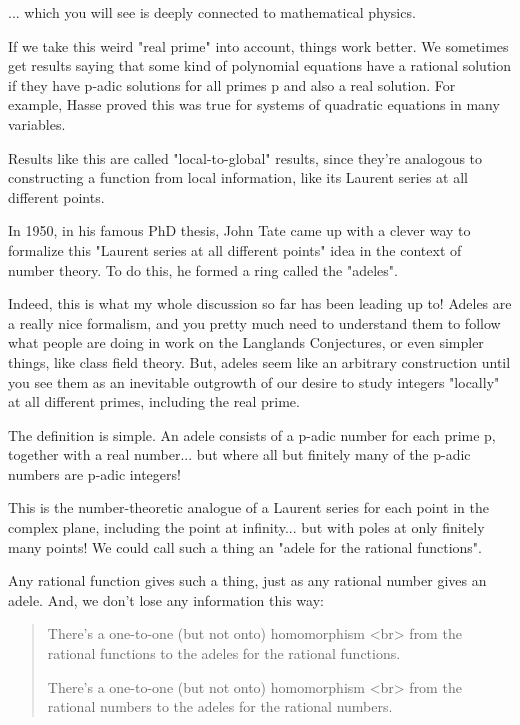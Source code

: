 ... which you will see is deeply connected to mathematical physics.

If we take this weird "real prime" into account, things work better.  
We sometimes get results saying that some kind of polynomial equations 
have a rational solution if they have p-adic solutions for all primes p 
and also a real solution.  For example, Hasse proved this was true for 
systems of quadratic equations in many variables.

Results like this are called "local-to-global" results,
since they're analogous to constructing a function from local
information, like its Laurent series at all different points.

In 1950, in his famous PhD thesis, John Tate came up with a clever way to 
formalize this "Laurent series at all different points" idea in the context 
of number theory.  To do this, he formed a ring called the "adeles".  

Indeed, this is what my whole discussion so far has been leading up
to!  Adeles are a really nice formalism, and you pretty much need to
understand them to follow what people are doing in work on the
Langlands Conjectures, or even simpler things, like class field
theory.  But, adeles seem like an arbitrary construction until you see
them as an inevitable outgrowth of our desire to study integers
"locally" at all different primes, including the real prime.

The definition is simple.   An adele consists of a p-adic number for each 
prime p, together with a real number... but where all but finitely many 
of the p-adic numbers are p-adic integers!

This is the number-theoretic analogue of a Laurent series for each point in 
the complex plane, including the point at infinity... but with poles at only 
finitely many points!  We could call such a thing an "adele for the rational
functions".  

Any rational function gives such a thing, just as any rational number gives 
an adele.  And, we don't lose any information this way:

\begin{quote}
   There's a one-to-one (but not onto) homomorphism <br>
   from the rational functions to the adeles for the rational functions.

   There's a one-to-one (but not onto) homomorphism <br>
   from the rational numbers to the adeles for the rational numbers.
\end{quote}


